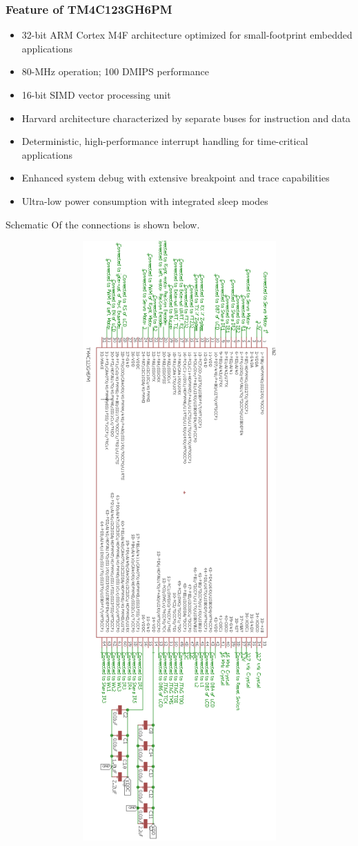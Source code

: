 \documentclass[a4paper,10pt,oneside]{article}
\begin{document}
{{	\subsubsection{\textbf{Feature of TM4C123GH6PM}}
		\begin{itemize}
			\item 32-bit ARM Cortex M4F architecture optimized for small-footprint embedded applications
			\item 80-MHz operation; 100 DMIPS performance
			\item 16-bit SIMD vector processing unit
			\item Harvard architecture characterized by separate buses for instruction and data
			\item Deterministic, high-performance interrupt handling for time-critical applications
			\item Enhanced system debug with extensive breakpoint and trace capabilities
			\item Ultra-low power consumption with integrated sleep modes
		\end{itemize}
	\newpage
	Schematic Of the connections is shown below.}
	\begin{center}
		\includegraphics[width=15cm, height=23cm]{uc}\\

\end{center}}
\end{document}
